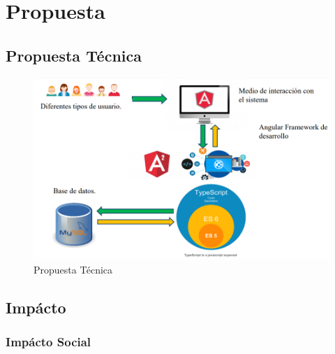 \chapter{Propuesta} \label{sec:propuesta}

\section{Propuesta Técnica}

\begin{figure}[h]
  \label{propuesta}
  \centering
  \includegraphics[scale=.5]{lib/assets/propuesta-tecnica}
  \caption{Propuesta Técnica}
\end{figure}

\section{Impácto}
\subsection{Impácto Social}

